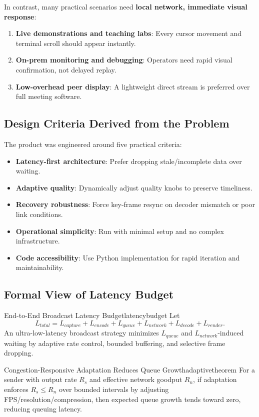 \documentclass[12pt,a4paper]{article}
\begin{document}
In contrast, many practical scenarios need \textbf{local network, immediate visual response}:
\begin{enumerate}[label=\textbf{\arabic*.}, itemsep=6pt]
  \item \textbf{Live demonstrations and teaching labs}: Every cursor movement and terminal scroll should appear instantly.
  \item \textbf{On-prem monitoring and debugging}: Operators need rapid visual confirmation, not delayed replay.
  \item \textbf{Low-overhead peer display}: A lightweight direct stream is preferred over full meeting software.
\end{enumerate}

\subsection{Design Criteria Derived from the Problem}
The product was engineered around five practical criteria:
\begin{itemize}[leftmargin=*, itemsep=4pt]
  \item \textbf{Latency-first architecture}: Prefer dropping stale/incomplete data over waiting.
  \item \textbf{Adaptive quality}: Dynamically adjust quality knobs to preserve timeliness.
  \item \textbf{Recovery robustness}: Force key-frame resync on decoder mismatch or poor link conditions.
  \item \textbf{Operational simplicity}: Run with minimal setup and no complex infrastructure.
  \item \textbf{Code accessibility}: Use Python implementation for rapid iteration and maintainability.
\end{itemize}

\subsection{Formal View of Latency Budget}
\begin{definition}{End-to-End Broadcast Latency Budget}{latencybudget}
Let
\[
L_{total} = L_{capture} + L_{encode} + L_{queue} + L_{network} + L_{decode} + L_{render}.
\]
An ultra-low-latency broadcast strategy minimizes \(L_{queue}\) and \(L_{network}\)-induced waiting by adaptive rate control, bounded buffering, and selective frame dropping.
\end{definition}

\begin{theorem}{Congestion-Responsive Adaptation Reduces Queue Growth}{adaptivetheorem}
For a sender with output rate \(R_s\) and effective network goodput \(R_n\), if adaptation enforces \(R_s \leq R_n\) over bounded intervals by adjusting FPS/resolution/compression, then expected queue growth tends toward zero, reducing queuing latency.
\end{theorem}
\end{document}
